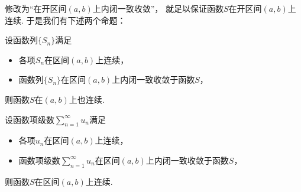 修改为“在开区间\((a,b)\)上内闭一致收敛”，
就足以保证函数\(S\)在开区间\((a,b)\)上连续.
于是我们有下述两个命题：
\begin{proposition}\label{theorem:函数项级数.连续函数列的内闭一致收敛性保证极限函数的连续性}
设函数列\(\{S_n\}\)满足\begin{itemize}
	\item 各项\(S_n\)在区间\((a,b)\)上连续，
	\item 函数列\(\{S_n\}\)在区间\((a,b)\)上内闭一致收敛于函数\(S\)，
\end{itemize}
则函数\(S\)在\((a,b)\)上也连续.
\end{proposition}
\begin{proposition}\label{theorem:函数项级数.连续函数项级数的内闭一致收敛性保证和函数的连续性}
设函数项级数\(\sum_{n=1}^\infty u_n\)满足\begin{itemize}
	\item 各项\(u_n\)在区间\((a,b)\)上连续，
	\item 函数项级数\(\sum_{n=1}^\infty u_n\)在区间\((a,b)\)上内闭一致收敛于函数\(S\)，
\end{itemize}
则函数\(S\)在区间\((a,b)\)上连续.
\end{proposition}

